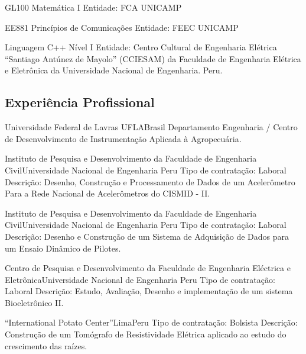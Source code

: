 \documentclass[11pt,a4paper,sans]{moderncv} %
\begin{document}
			  {GL100 }{Matemática I}{}
			  {Entidade: FCA UNICAMP }

			  {EE881 }{Princípios de Comunicações}{}
			  {Entidade: FEEC UNICAMP }

	      {Linguagem C++ }{ Nível I}{}
	      {Entidade: Centro Cultural de Engenharia Elétrica ``Santiago 
	      Antúnez de Mayolo'' (CCIESAM) da Faculdade de Engenharia Elétrica 
	      e Eletrônica da Universidade Nacional de Engenharia. Peru.}

\subsection{Experiência Profissional}


	      {Universidade Federal de Lavras}
	      {UFLA}{Brasil}
	      {Departamento Engenharia / Centro de Desenvolvimento de Instrumentação Aplicada à Agropecuária. }


		      {Instituto de Pesquisa e Desenvolvimento da Faculdade 
		      de Engenharia Civil}{Universidade Nacional de Engenharia }{Peru}
		      {Tipo de contratação: Laboral\newline{}
		      Descrição: Desenho, Construção e Processamento de Dados de um 
		      Acelerômetro Para a Rede Nacional de Acelerômetros do CISMID - II.}

		      {Instituto de Pesquisa e Desenvolvimento da Faculdade 
		      de Engenharia Civil}{Universidade Nacional de Engenharia }{Peru}
		      {Tipo de contratação: Laboral\newline{}
		      Descrição: Desenho e  Construção  de  um  Sistema  de  
		      Adquisição  de  Dados para  um  Ensaio  Dinâmico  de  Pilotes.}

		      {Centro de Pesquisa e Desenvolvimento da Faculdade de 
		      Engenharia Eléctrica e Eletrônica}{Universidade Nacional de Engenharia }{Peru}
		      {Tipo de contratação: Laboral\newline{}
		      Descrição: Estudo, Avaliação, Desenho e implementação de um sistema Bioeletrônico II.}

		      {``International Potato Center''}{Lima}{Peru}
		      {Tipo de contratação: Bolsista\newline{}
		      Descrição: Construção  de  um  Tomógrafo  de  Resistividade 
		      Elétrica  aplicado ao  estudo  do  crescimento  das  raízes.}
\end{document}
